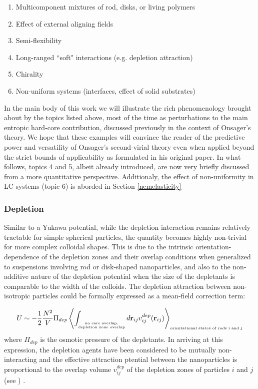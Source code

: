 \begin{enumerate}
\item Multicomponent mixtures of rod, disks, or living polymers
\item Effect of external aligning fields
\item Semi-flexibility
\item Long-ranged ``soft" interactions (e.g. depletion attraction)
\item Chirality
\item Non-uniform systems (interfaces, effect of solid substrates)
\end{enumerate}

In the main body of this work we will illustrate the rich phenomenology brought about by the topics listed above, most of the time as perturbations to the main entropic hard-core contribution, discussed previously in the context of Onsager's theory. We hope that these examples will convince the reader of the predictive power and versatility of Onsager's second-virial theory even when applied beyond the strict bounds of applicability as formulated in his original paper. In what follows, topics 4 and 5, albeit already introduced, are now very briefly discussed from a more quantitative perspective. Additionaly, the effect of non-uniformity in LC systems (topic 6) is aborded in Section \ref{nemelasticity}

\subsubsection{Depletion}

Similar to a Yukawa potential, while the depletion interaction remains relatively tractable for simple spherical particles, the quantity becomes highly non-trivial for more complex colloidal shapes. This is due to the intrinsic orientation-dependence of the depletion zones and their overlap conditions when generalized to suspensions involving rod or disk-shaped nanoparticles, and also to the non-additive nature of the depletion potential when the size of the depletants is comparable to the width of the colloids. The depletion attraction between non-isotropic particles could be formally expressed as a mean-field correction term:


 \begin{equation}
U \sim  -\frac{1}{2} \frac{N^{2}}{V} \Pi_{dep} \left \langle \int_{
\substack{
\mbox{\tiny no core overlap,} \\
\mbox{\tiny depletion zone overlap}
}
} d {\bf r}_{ij}   v^{dep}_{ij}({\bf r}_{ij})  \right \rangle_{\mbox{\tiny orientational states of rods i and j}}
\label{degen}
\end{equation}
where $\Pi_{dep}$ is the osmotic pressure of the depletants. In arriving at this expression, the depletion agents have been considered to be mutually non-interacting and the effective attraction ptential between the nanoparticles is proportional to the overlap volume $v^{dep}_{ij}$ of the depletion zones of particles $i$ and $j$ (see ) \cite{LekkerkerkerTuinier2011}.

